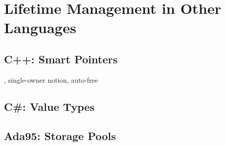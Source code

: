 \chapter{Lifetime Management in Other Languages}

\section{C++: Smart Pointers}

, single-owner notion, auto-free

\section{C\#: Value Types}

\section{Ada95: Storage Pools}
